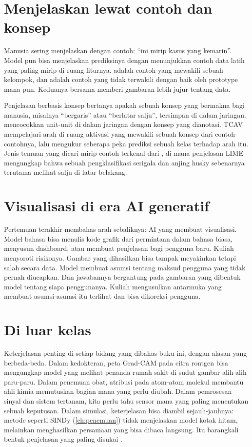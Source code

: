 \section{Menjelaskan lewat contoh dan konsep}

Manusia sering menjelaskan dengan contoh: ``ini mirip kasus yang kemarin''. Model pun bisa
menjelaskan prediksinya dengan menunjukkan contoh data latih yang paling mirip di ruang fiturnya.
 adalah contoh yang mewakili sebuah kelompok, dan  adalah contoh yang
tidak terwakili dengan baik oleh prototype mana pun. Keduanya bersama memberi gambaran lebih jujur
tentang data.

Penjelasan berbasis konsep bertanya apakah sebuah konsep yang bermakna bagi manusia, misalnya
``bergaris'' atau ``berlatar salju'', tersimpan di dalam jaringan.  mencocokkan
unit-unit di dalam jaringan dengan konsep yang dianotasi. TCAV \citep{kim2018} mempelajari arah di
ruang aktivasi yang mewakili sebuah konsep dari contoh-contohnya, lalu mengukur seberapa peka
prediksi sebuah kelas terhadap arah itu. Jenis temuan yang dicari mirip contoh terkenal dari
\citet{ribeiro2016}, di mana penjelasan LIME mengungkap bahwa sebuah pengklasifikasi serigala dan
anjing husky sebenarnya terutama melihat salju di latar belakang.

\section{Visualisasi di era AI generatif}

Pertemuan terakhir membahas arah sebaliknya: AI yang membuat visualisasi. Model bahasa bisa menulis
kode grafik dari permintaan dalam bahasa biasa, menyusun dashboard, atau membuat penjelasan bagi
pengguna baru. Kuliah menyoroti risikonya. Gambar yang dihasilkan bisa tampak meyakinkan tetapi
salah secara data. Model membuat asumsi tentang maksud pengguna yang tidak pernah diucapkan. Dan
jawabannya bergantung pada gambaran yang dibentuk model tentang siapa penggunanya. Kuliah
mengusulkan antarmuka yang membuat asumsi-asumsi itu terlihat dan bisa dikoreksi pengguna.

\section{Di luar kelas}

Keterjelasan penting di setiap bidang yang dibahas buku ini, dengan alasan yang berbeda-beda.
Dalam kedokteran, peta Grad-CAM pada citra rontgen bisa mengungkap model yang melihat penanda
rumah sakit di sudut gambar alih-alih paru-paru. Dalam penemuan obat, atribusi pada atom-atom molekul
membantu ahli kimia memutuskan bagian mana yang perlu diubah. Dalam pemrosesan sinyal dan sistem
tertanam, kita perlu tahu sensor mana yang paling menentukan sebuah keputusan. Dalam simulasi,
keterjelasan bisa diambil sejauh-jauhnya: metode seperti SINDy (\cref{ch:penemuan}) tidak menjelaskan
model kotak hitam, melainkan menghasilkan persamaan yang bisa dibaca langsung. Itu barangkali bentuk
penjelasan yang paling disukai \citet{rudin2019}.

